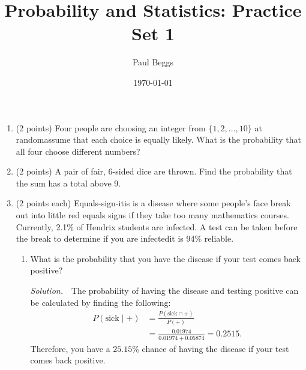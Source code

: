 \documentclass[11pt]{article}
\title{Probability and Statistics: Practice Set 1}
\author{Paul Beggs}
\date{\today}
\newenvironment{solution}
  {\textit{Solution.}}
\newcommand{\sol}[1]{
    \begin{customframedproof}[linecolor=orangehdx!75,]
        \begin{solution}
        #1
        \end{solution}
    \end{customframedproof}
}
\begin{document}
\maketitle
\begin{enumerate}
\vspace*{-0.25in}
  	\item (2 points) Four people are choosing an integer from \(\{1,2,\dots,10\}\) at random\textemdash assume that each choice is equally likely. What is the probability that all four choose different numbers?

	\item (2 points) A pair of fair, 6-sided dice are thrown. Find the probability that the sum has a total above 9.
	\item (2 points each) Equals-sign-itis is a disease where some people's face break out into little red equals signs if they take too many mathematics courses. Currently, 2.1\% of Hendrix students are infected. A test can be taken before the break to determine if you are infected\textemdash it is 94\% reliable.
	\begin{enumerate}[label=(\alph*)]
		\item What is the probability that you have the disease if your test comes back positive?
		\begin{customframedproof}[linecolor=orangehdx!75]
			\vspace*{-.8em}
			\begin{multicols}{2}
				\begin{minipage}[t]{\linewidth}
					\textit{Solution.}\ \ The probability of having the disease and testing positive can be calculated by finding the following:
					\begin{align*}
						P(\text{sick} \mid +) &= \frac{P(\text{sick} \cap +)}{P(+)} \\
						&= \frac{0.01974}{0.01974 + 0.05874} = 0.2515.
					\end{align*}
					Therefore, you have a \(\boxed{25.15\%}\) chance of having the disease if your test comes back positive.
				\end{minipage}


\end{multicols}
\end{customframedproof}
\end{enumerate}
\end{enumerate}
\end{document}
